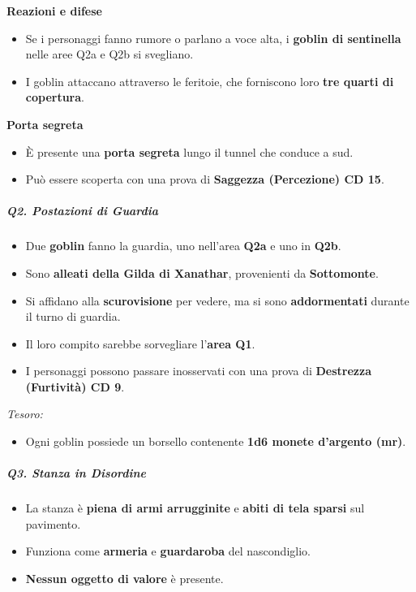 \documentclass{article}
\begin{document}
\textbf{Reazioni e difese}
\begin{itemize}
    \item Se i personaggi fanno rumore o parlano a voce alta, i \textbf{goblin di sentinella} nelle aree Q2a e Q2b si svegliano.
    \item I goblin attaccano attraverso le feritoie, che forniscono loro \textbf{tre quarti di copertura}.
\end{itemize}

\textbf{Porta segreta}
\begin{itemize}
    \item È presente una \textbf{porta segreta} lungo il tunnel che conduce a sud.
    \item Può essere scoperta con una prova di \textbf{Saggezza (Percezione) CD 15}.
\end{itemize}

\subparagraph{Q2. Postazioni di Guardia}
\begin{itemize}
    \item Due \textbf{goblin} fanno la guardia, uno nell’area \textbf{Q2a} e uno in \textbf{Q2b}.
    \item Sono \textbf{alleati della Gilda di Xanathar}, provenienti da \textbf{Sottomonte}.
    \item Si affidano alla \textbf{scurovisione} per vedere, ma si sono \textbf{addormentati} durante il turno di guardia.
    \item Il loro compito sarebbe sorvegliare l’\textbf{area Q1}.
    \item I personaggi possono passare inosservati con una prova di \textbf{Destrezza (Furtività) CD 9}.
\end{itemize}

\textit{Tesoro:}
\begin{itemize}
    \item Ogni goblin possiede un borsello contenente \textbf{1d6 monete d’argento (mr)}.
\end{itemize}

\subparagraph{Q3. Stanza in Disordine}
\begin{itemize}
    \item La stanza è \textbf{piena di armi arrugginite} e \textbf{abiti di tela sparsi} sul pavimento.
    \item Funziona come \textbf{armeria} e \textbf{guardaroba} del nascondiglio.
    \item \textbf{Nessun oggetto di valore} è presente.
\end{itemize}
\end{document}
